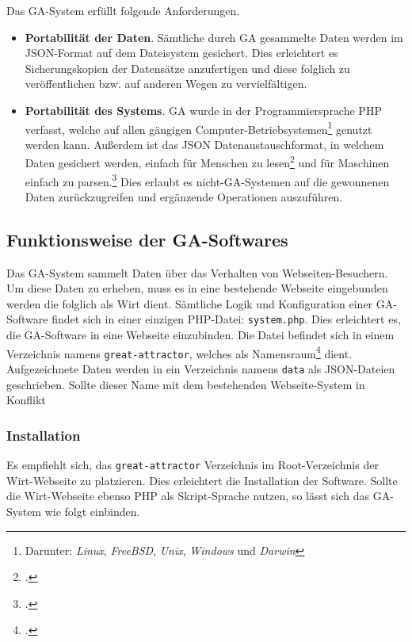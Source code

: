 Das GA-System erfüllt folgende Anforderungen.

\begin{itemize}
\item
  \textbf{Portabilität der Daten}. Sämtliche durch GA gesammelte Daten werden im
  JSON-Format auf dem Dateisystem gesichert. Dies erleichtert es
  Sicherungskopien der Datensätze anzufertigen und diese folglich zu
  veröffentlichen bzw. auf anderen Wegen zu vervielfältigen.
\item
  \textbf{Portabilität des Systems}. GA wurde in der Programmiersprache PHP
  verfasst, welche auf allen gängigen Computer-Betriebsystemen\footnote{
  Darunter: \emph{Linux}, \emph{FreeBSD}, \emph{Unix}, \emph{Windows}
  und \emph{Darwin}} genutzt werden kann. Außerdem ist das JSON
  Datenaustauschformat, in welchem Daten gesichert werden, einfach für Menschen
  zu lesen\footcite{jsonDe} und für Maschinen einfach zu
  parsen.\footcite{jsonDe} Dies erlaubt es nicht-GA-Systemen auf die gewonnenen
  Daten zurückzugreifen und ergänzende Operationen auszuführen.
\end{itemize}

\subsection{Funktionsweise der GA-Softwares}
\label{sub:funktionsweise_der_ga_softwares}
Das GA-System sammelt Daten über das Verhalten von Webseiten-Besuchern. Um
diese Daten zu erheben, muss es in eine bestehende Webseite eingebunden werden
die folglich als Wirt dient. Sämtliche Logik und Konfiguration einer
GA-Software findet sich in einer einzigen PHP-Datei: \texttt{system.php}. Dies
erleichtert es, die GA-Software in eine Webseite einzubinden. Die Datei
befindet sich in einem Verzeichnis namens \texttt{great-attractor}, welches als
Namensraum\footcite{wp:namensraum} dient. Aufgezeichnete Daten werden in ein
Verzeichnis namens \texttt{data} als JSON-Dateien geschrieben. Sollte dieser
Name mit dem bestehenden Webseite-System in Konflikt

\subsubsection{Installation}
\label{ssub:ga_installation}
Es empfiehlt sich, das \texttt{great-attractor} Verzeichnis im Root-Verzeichnis
der Wirt-Webseite zu platzieren. Dies erleichtert die Installation der
Software. Sollte die Wirt-Webseite ebenso PHP als Skript-Sprache nutzen, so
lässt sich das GA-System wie folgt einbinden.

